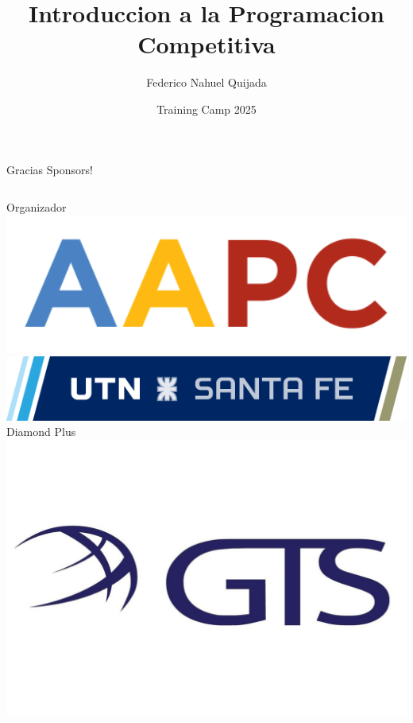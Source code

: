 \documentclass{beamer}
\title %
{Introduccion a la Programacion Competitiva}
\author[Federico Nahuel Quijada]{Federico Nahuel Quijada}
\institute[]{Universidad Tecnológica Nacional - Facultad Regional Santa Fe}
\date[TC 2025]{Training Camp 2025}
\begin{document}
\frame{\titlepage}





\begin{frame}{Gracias Sponsors!}
    \begin{columns}[t]
        \centering
        Organizador\\
        \vspace{0.5cm}
        \includegraphics[width=1\textwidth,keepaspectratio]{logos/aapc.png}
        \includegraphics[width=1\textwidth,keepaspectratio]{logos/utn_santafe.png}
        \centering
        Diamond Plus\\
        \includegraphics[width=1\textwidth,keepaspectratio]{logos/GTSlogo.jpeg}
    \end{columns}
\end{frame}
\end{document}
